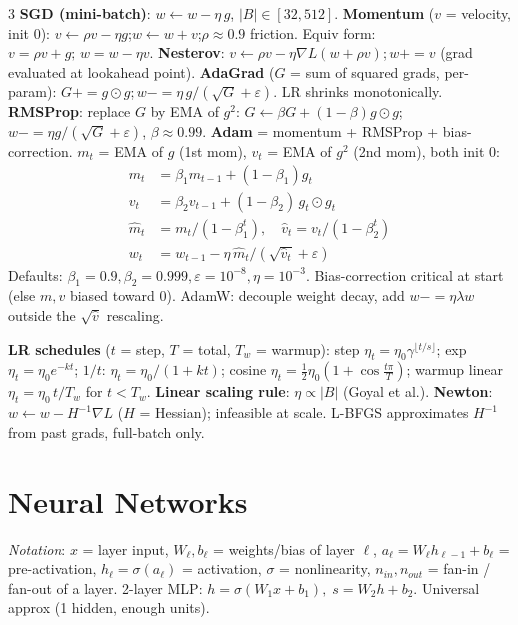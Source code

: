 \documentclass[a4paper,9pt,landscape]{scrartcl}
\begin{document}
\begin{multicols*}{3}
\textbf{SGD (mini-batch)}: $w\!\leftarrow\!w-\eta\,g$, $|B|\!\in\![32,512]$.
\textbf{Momentum} ($v$ = velocity, init 0): $v\!\leftarrow\!\rho v-\eta g$;\;$w\!\leftarrow\!w+v$;\;$\rho{\approx}0.9$ friction. Equiv form: $v\!=\!\rho v+g;\,w\!=\!w-\eta v$.
\textbf{Nesterov}: $v\!\leftarrow\!\rho v-\eta\nabla L(w+\rho v)$;\,$w\!+=\!v$ (grad evaluated at lookahead point).
\textbf{AdaGrad} ($G$ = sum of squared grads, per-param): $G\!+=\!g\odot g$;\,$w\!-=\!\eta\,g/(\sqrt{G}+\varepsilon)$. LR shrinks monotonically.
\textbf{RMSProp}: replace $G$ by EMA of $g^2$: $G\!\leftarrow\!\beta G+(1{-}\beta)g\odot g$;\,$w\!-=\!\eta g/(\sqrt G+\varepsilon)$, $\beta{\approx}0.99$.
\textbf{Adam} = momentum + RMSProp + bias-correction. $m_t$ = EMA of $g$ (1st mom), $v_t$ = EMA of $g^2$ (2nd mom), both init 0:
\begin{align*}
m_t&=\beta_1 m_{t-1}+(1-\beta_1)g_t\\
v_t&=\beta_2 v_{t-1}+(1-\beta_2)\,g_t\!\odot\!g_t\\
\hat m_t&=m_t/(1-\beta_1^t),\quad \hat v_t=v_t/(1-\beta_2^t)\\
w_t&=w_{t-1}-\eta\,\hat m_t/(\sqrt{\hat v_t}+\varepsilon)
\end{align*}
Defaults: $\beta_1{=}0.9,\beta_2{=}0.999,\varepsilon{=}10^{-8},\eta{=}10^{-3}$. Bias-correction critical at start (else $m,v$ biased toward 0). AdamW: decouple weight decay, add $w\!-=\!\eta\lambda w$ outside the $\sqrt{\hat v}$ rescaling.

\textbf{LR schedules} ($t$ = step, $T$ = total, $T_w$ = warmup): step $\eta_t=\eta_0\gamma^{\lfloor t/s\rfloor}$;\; exp $\eta_t=\eta_0 e^{-kt}$;\; $1/t$: $\eta_t=\eta_0/(1+kt)$;\; cosine $\eta_t=\tfrac12\eta_0\!\left(1+\cos\tfrac{t\pi}{T}\right)$;\; warmup linear $\eta_t=\eta_0\,t/T_w$ for $t<T_w$.
\textbf{Linear scaling rule}: $\eta\propto |B|$ (Goyal et al.).
\textbf{Newton}: $w\!\leftarrow\!w-H^{-1}\nabla L$ ($H$ = Hessian); infeasible at scale. L-BFGS approximates $H^{-1}$ from past grads, full-batch only.

\section{Neural Networks}
\textit{Notation}: $x$ = layer input, $W_\ell,b_\ell$ = weights/bias of layer $\ell$, $a_\ell{=}W_\ell h_{\ell-1}+b_\ell$ = pre-activation, $h_\ell{=}\sigma(a_\ell)$ = activation, $\sigma$ = nonlinearity, $n_{in},n_{out}$ = fan-in / fan-out of a layer.
2-layer MLP: $h=\sigma(W_1 x+b_1),\;s=W_2 h+b_2$. Universal approx (1 hidden, enough units).


\end{multicols*}
\end{document}
